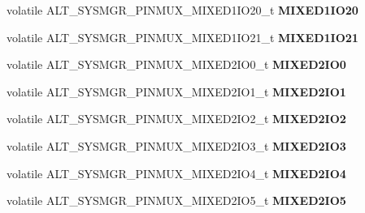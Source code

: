 \begin{DoxyCompactItemize}
volatile A\+L\+T\+\_\+\+S\+Y\+S\+M\+G\+R\+\_\+\+P\+I\+N\+M\+U\+X\+\_\+\+M\+I\+X\+E\+D1\+I\+O20\+\_\+t {\bfseries M\+I\+X\+E\+D1\+I\+O20}
\item 
\mbox{\label{structALT__SYSMGR__PINMUX__s_ab83bcfb593504c623b90afe734296dc9}} 
volatile A\+L\+T\+\_\+\+S\+Y\+S\+M\+G\+R\+\_\+\+P\+I\+N\+M\+U\+X\+\_\+\+M\+I\+X\+E\+D1\+I\+O21\+\_\+t {\bfseries M\+I\+X\+E\+D1\+I\+O21}
\item 
\mbox{\label{structALT__SYSMGR__PINMUX__s_a4e4094316ca5ceea0df654bf5401edeb}} 
volatile A\+L\+T\+\_\+\+S\+Y\+S\+M\+G\+R\+\_\+\+P\+I\+N\+M\+U\+X\+\_\+\+M\+I\+X\+E\+D2\+I\+O0\+\_\+t {\bfseries M\+I\+X\+E\+D2\+I\+O0}
\item 
\mbox{\label{structALT__SYSMGR__PINMUX__s_ad1b9bf0b2d674e761f223715b9c4a629}} 
volatile A\+L\+T\+\_\+\+S\+Y\+S\+M\+G\+R\+\_\+\+P\+I\+N\+M\+U\+X\+\_\+\+M\+I\+X\+E\+D2\+I\+O1\+\_\+t {\bfseries M\+I\+X\+E\+D2\+I\+O1}
\item 
\mbox{\label{structALT__SYSMGR__PINMUX__s_af77114b568116cc76860cfdc75316afc}} 
volatile A\+L\+T\+\_\+\+S\+Y\+S\+M\+G\+R\+\_\+\+P\+I\+N\+M\+U\+X\+\_\+\+M\+I\+X\+E\+D2\+I\+O2\+\_\+t {\bfseries M\+I\+X\+E\+D2\+I\+O2}
\item 
\mbox{\label{structALT__SYSMGR__PINMUX__s_ac68e025f9a8602c0ae8fcbea45906f30}} 
volatile A\+L\+T\+\_\+\+S\+Y\+S\+M\+G\+R\+\_\+\+P\+I\+N\+M\+U\+X\+\_\+\+M\+I\+X\+E\+D2\+I\+O3\+\_\+t {\bfseries M\+I\+X\+E\+D2\+I\+O3}
\item 
\mbox{\label{structALT__SYSMGR__PINMUX__s_a545be9a39a1eb5959a5dfab2e15c2608}} 
volatile A\+L\+T\+\_\+\+S\+Y\+S\+M\+G\+R\+\_\+\+P\+I\+N\+M\+U\+X\+\_\+\+M\+I\+X\+E\+D2\+I\+O4\+\_\+t {\bfseries M\+I\+X\+E\+D2\+I\+O4}
\item 
\mbox{\label{structALT__SYSMGR__PINMUX__s_a8dd1ba6ab0277ddf05afa520821f5a3d}} 
volatile A\+L\+T\+\_\+\+S\+Y\+S\+M\+G\+R\+\_\+\+P\+I\+N\+M\+U\+X\+\_\+\+M\+I\+X\+E\+D2\+I\+O5\+\_\+t {\bfseries M\+I\+X\+E\+D2\+I\+O5}
\item 
\mbox{\label{structALT__SYSMGR__PINMUX__s_a0af6dcf5f4675c4ef298ad6186d3d5e5}} 

\end{DoxyCompactItemize}

